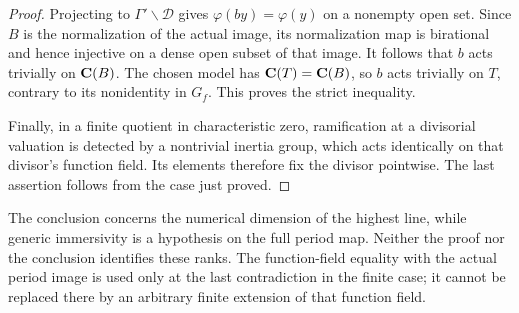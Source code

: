 \begin{proof}
Projecting to $\Gamma'\backslash\mathcal D$ gives
$\varphi(by)=\varphi(y)$ on a nonempty open set. Since $B$ is the
normalization of the actual image, its normalization map is
birational and hence injective on a dense open subset of that
image. It follows that $b$ acts trivially on $\mathbf C(B)$. The chosen
model has $\mathbf C(T)=\mathbf C(B)$, so $b$ acts trivially on $T$, contrary
to its nonidentity in $G_f$. This proves the strict inequality.

Finally, in a finite quotient in characteristic zero, ramification
at a divisorial valuation is detected by a nontrivial inertia
group, which acts identically on that divisor's function field.
Its elements therefore fix the divisor pointwise. The last
assertion follows from the case just proved.
\end{proof}

\begin{remark}
The conclusion concerns the numerical dimension of the highest line,
while generic immersivity is a hypothesis on the full period map.
Neither the proof nor the conclusion identifies these ranks. The
function-field equality with the actual period image is used only
at the last contradiction in the finite case; it cannot be replaced
there by an arbitrary finite extension of that function field.
\end{remark}
